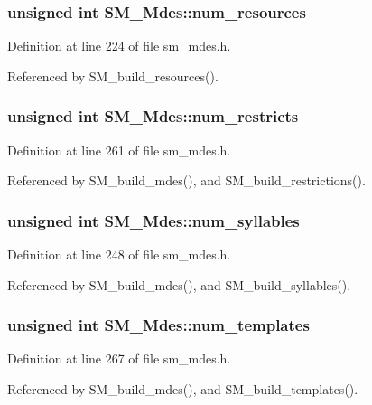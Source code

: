 \subsubsection{\setlength{\rightskip}{0pt plus 5cm}unsigned int \bf{SM\_\-Mdes::num\_\-resources}}\label{structSM__Mdes_c17dd34b37c13e5dc5a75021a2fa2dd4}




Definition at line 224 of file sm\_\-mdes.h.

Referenced by SM\_\-build\_\-resources().
\subsubsection{\setlength{\rightskip}{0pt plus 5cm}unsigned int \bf{SM\_\-Mdes::num\_\-restricts}}\label{structSM__Mdes_2a6555fa048e325387ee4f6c64d3234d}




Definition at line 261 of file sm\_\-mdes.h.

Referenced by SM\_\-build\_\-mdes(), and SM\_\-build\_\-restrictions().
\subsubsection{\setlength{\rightskip}{0pt plus 5cm}unsigned int \bf{SM\_\-Mdes::num\_\-syllables}}\label{structSM__Mdes_bcbacea4368c16bd105a91694e7df0ff}




Definition at line 248 of file sm\_\-mdes.h.

Referenced by SM\_\-build\_\-mdes(), and SM\_\-build\_\-syllables().
\subsubsection{\setlength{\rightskip}{0pt plus 5cm}unsigned int \bf{SM\_\-Mdes::num\_\-templates}}\label{structSM__Mdes_ff09d25cd2535f05de62452a5ce799cd}




Definition at line 267 of file sm\_\-mdes.h.

Referenced by SM\_\-build\_\-mdes(), and SM\_\-build\_\-templates().
